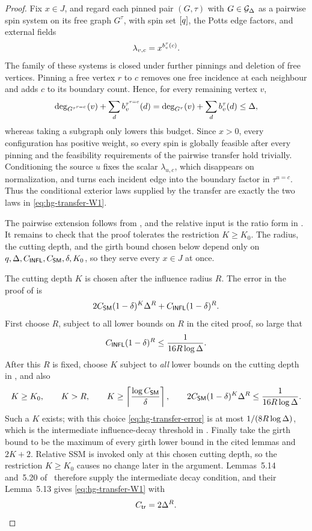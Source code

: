 \begin{proof}
Fix \(x\in J\), and regard each pinned pair \((G,\tau)\) with \(G\in\mathcal{G}_{\Delta}\) as
a pairwise spin system on its free graph \(G^\tau\), with spin set
\([q]\), the Potts edge factors, and external fields
\[
  \lambda_{v,c}=x^{b_v^\tau(c)}.
\]
The family of these systems is closed under further pinnings and deletion of
free vertices.  Pinning a free vertex $r$ to $c$ removes one free incidence at
each neighbour and adds $c$ to its boundary count.  Hence, for every remaining
vertex $v$,
\[
  \deg_{G^{\tau^{r=c}}}(v)
    +\sum_db_v^{\tau^{r=c}}(d)
  =\deg_{G^\tau}(v)+\sum_db_v^\tau(d)
  \le\Delta,
\]
whereas taking a subgraph only lowers this budget.  Since \(x>0\), every
configuration has positive weight, so every spin is globally feasible after
every pinning and the feasibility requirements of the pairwise transfer hold
trivially.  Conditioning the source \(u\) fixes the scalar
\(\lambda_{u,c}\), which disappears on normalization, and turns each incident
edge into the boundary factor in \(\tau^{u=c}\).  Thus the conditional
exterior laws supplied by the transfer are exactly the two laws in
\eqref{eq:hg-transfer-W1}.

The pairwise extension follows from \cite[Remark~5.11]{CLMM2023}, and the
relative input is the ratio form in
\cite[Definition~5.7]{CLMM2023}.  It remains to check that the proof tolerates
the restriction \(K\ge K_0\).  The radius, the cutting depth, and the girth
bound chosen below depend only on
\(q,\Delta,C_{\mathsf{INFL}},C_{\mathsf{SM}},\delta,K_0\), so they serve every
\(x\in J\) at once.

The cutting depth \(K\) is chosen after the influence radius \(R\).  The error
in the proof of \cite[Lemma~5.14]{CLMM2023} is
\begin{equation}
  2C_{\mathsf{SM}}(1-\delta)^K\Delta^R
  +C_{\mathsf{INFL}}(1-\delta)^R.
  \label{eq:hg-transfer-error}
\end{equation}
First choose $R$, subject to all lower bounds on $R$ in the cited proof, so
large that
\[
 C_{\mathsf{INFL}}(1-\delta)^R
 \le\frac1{16R\log\Delta}.
\]
After this $R$ is fixed, choose $K$ subject to \emph{all} lower bounds on the
cutting depth in \cite[Lemmas~5.14 and~5.20]{CLMM2023}, and also
\[
 K\ge K_0,\qquad K>R,\qquad
 K\ge\left\lceil\frac{\log C_{\mathsf{SM}}}{\delta}\right\rceil,\qquad
 2C_{\mathsf{SM}}(1-\delta)^K\Delta^R
 \le\frac1{16R\log\Delta}.
\]
Such a $K$ exists; with this choice \eqref{eq:hg-transfer-error} is at most
$1/(8R\log\Delta)$, which is the intermediate influence-decay threshold in
\cite[Lemma~5.14]{CLMM2023}.
Finally take the girth bound to be the maximum of every girth lower bound in
the cited lemmas and $2K+2$.  Relative SSM is invoked only at this chosen
cutting depth, so the restriction \(K\ge K_0\) causes no change later in the
argument.  Lemmas~5.14 and~5.20 of~\cite{CLMM2023} therefore supply the
intermediate decay condition, and their Lemma~5.13 gives
\eqref{eq:hg-transfer-W1} with
\[
 C_{\mathsf{tr}}=2\Delta^R.
\]
\end{proof}

